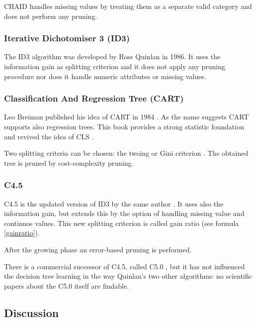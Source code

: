 CHAID handles missing values by treating them as a separate valid category and does not perform any pruning. 


\subsubsection{Iterative Dichotomiser 3 (ID3)} 

The ID3 algorithm was developed by Ross Quinlan in 1986. It uses the information gain as splitting criterion and it does not apply any pruning procedure nor does it handle numeric attributes or missing values.


\subsubsection{Classification And Regression Tree (CART)} 

Leo Breiman published his idea of CART in 1984 \cite{quinlandecisiontreediscovery}. As the name suggests CART supports also regression trees. This book provides a strong statistic foundation and revived the idea of CLS \cite[p. 435]{duda2012pattern}.

Two splitting criteria can be chosen: the twoing or Gini criterion \cite[p. 1]{shih1999families}. The obtained tree is pruned by cost-complexity pruning.  


\subsubsection{C4.5}

C4.5 is the updated version of ID3 by the same author \cite{Kohavi99decisiontree}. It uses also the information gain, but extends this by the option of handling missing value and continuos values. This new splitting criterion is called gain ratio (see formula \ref{gainratio}).

After the growing phase an error-based pruning is performed.



\begin{remark}
    There is a commercial successor of C4.5, called C5.0 \cite{Kohavi99decisiontree}, but it has not influenced the decision tree learning in the way Quinlan's two other algorithms: no scientific papers about the C5.0 itself are findable. 
\end{remark}






\subsection{Discussion}

